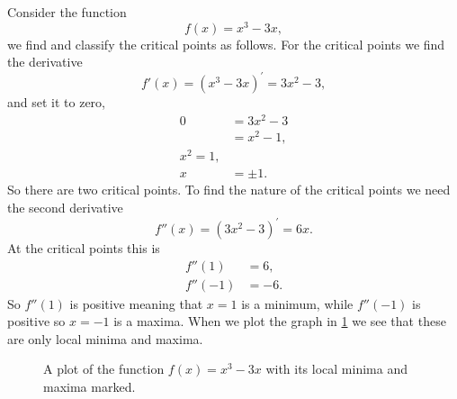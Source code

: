\begin{ex}
Consider the function
\begin{equation*}
f(x)=x^{3}-3x,
\end{equation*}
we find and classify the critical points as follows. For the critical points we find the derivative
\begin{equation*}
f'(x)=\left(x^{3}-3x\right)^{'}=3x^{2}-3,
\end{equation*}
and set it to zero,
\begin{align*}
0&=3x^{2}-3\\
	&=x^{2}-1,\\
x^{2}=1,\\
x&=\pm 1.
\end{align*}
So there are two critical points. To find the nature of the critical points we need the second derivative
\begin{equation*}
f''(x)=\left(3x^{2}-3\right)^{'}=6x.
\end{equation*}
At the critical points this is
\begin{align*}
f''(1)&=6,\\
f''(-1)&=-6.
\end{align*}
So $f''(1)$ is positive meaning that $x=1$ is a minimum, while $f''(-1)$ is positive so $x=-1$ is a maxima. When we plot the graph in \cref{fig: crit points 4} we see that these are only local minima and maxima.
\end{ex}
\begin{figure}[ht]
    \centering
{}
    \caption{A plot of the function $f(x)=x^{3}-3x$ with its local minima and maxima marked. }
        \label{fig: crit points 4}
\end{figure}


